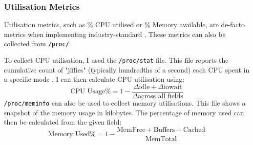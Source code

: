 \subsubsection{Utilisation Metrics}
Utilisation metrics, such as \% CPU utilised or \% Memory available, are
de-facto metrics when implementing industry-standard
\cite{hadoop2016apache,sahasrabudhe_improved_2015}. These metrics can also be
collected from \verb|/proc/|.

To collect CPU utilisation, I used the \verb|/proc/stat| file. This file reports
the cumulative count of "jiffies" (typically hundredths of a second) each CPU
spent in a specific mode \cite{proc_stat5}. I can then calculate CPU utilisation
using:
\[ \text{CPU Usage\%} = 1 - \frac{\Delta\text{idle} +
\Delta\text{iowait}}{\Delta\text{across all fields}} \]
\verb|/proc/meminfo| can also be used to collect memory utilisations. This file
shows a snapshot of the memory usage in kilobytes. The percentage of memory
used can then be calculated from the given field:
\[ \text{Memory Used\%} = 1 - \frac{\text{MemFree} +
\text{Buffers} + \text{Cached}}{\text{MemTotal}}\]

